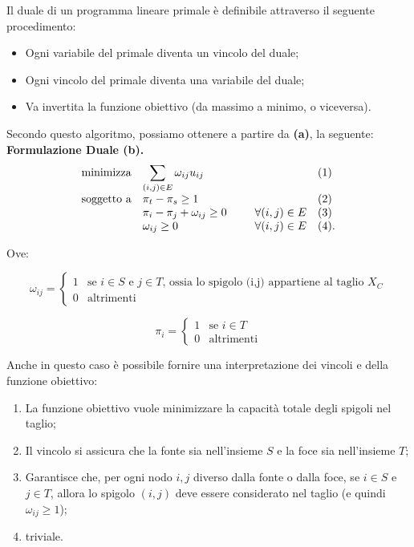 \documentclass{article}
\begin{document}
Il duale di un programma lineare primale è definibile attraverso il seguente procedimento:
\begin{itemize}
    \item Ogni variabile del primale diventa un vincolo del duale;
    \item Ogni vincolo del primale diventa una variabile del duale;
    \item Va invertita la funzione obiettivo (da massimo a minimo, o viceversa).
\end{itemize} 

Secondo questo algoritmo, possiamo ottenere a partire da \textbf{(a)}, la seguente:
\textbf{Formulazione Duale (b).}
\begin{equation*}
    \begin{array}{ll@{}ll}
    \text{minimizza}    & \displaystyle\sum_{(i, j) \in E} \omega_{ij}u_{ij} &  &(1)\\
    \text{soggetto a}   & \displaystyle \pi_t - \pi_s \geq 1 &   &(2)\\
                        & \displaystyle \pi_i - \pi_j  + \omega_{ij} \geq 0\;\;\;\;\;\;\;\;\; & \forall (i,j) \in E & (3)\\
                        & \displaystyle \omega_{ij} \geq 0 & \forall (i,j) \in E & (4).\\

    \end{array}
    \end{equation*}

Ove:

\begin{equation}
    \omega_{ij} =
        \begin{cases}
        1 & \text{se $i \in S$ e $j \in T$, ossia lo spigolo (i,j) appartiene al taglio $X_C$}\\
        0 & \text{altrimenti}
        \end{cases}       
\end{equation}

\begin{equation}
    \pi_{i} =
        \begin{cases}
        1 & \text{se $i \in T$}\\
        0 & \text{altrimenti}
        \end{cases}       
\end{equation}

Anche in questo caso è possibile fornire una interpretazione dei vincoli e della funzione obiettivo:
\begin{enumerate}
    \item La funzione obiettivo vuole minimizzare la capacità totale degli spigoli nel taglio;
    \item Il vincolo si assicura che la fonte sia nell'insieme $S$ e la foce sia nell'insieme $T$;
    \item Garantisce che, per ogni nodo $i, j$ diverso dalla fonte o dalla foce, se $i \in S$ e $j \in T$, allora lo spigolo $(i,j)$ deve essere considerato nel taglio
    (e quindi $\omega_{ij}\geq 1$);
    \item triviale.
\end{enumerate}
\end{document}
